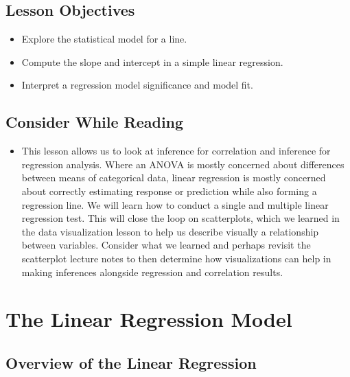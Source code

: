 \documentclass[
  letterpaper,
  DIV=11,
  numbers=noendperiod]{scrreprt}
\providecommand{\tightlist}{%
  \setlength{\itemsep}{0pt}\setlength{\parskip}{0pt}}\usepackage{longtable,booktabs,array}
\begin{document}
\section{Lesson Objectives}\label{lesson-objectives-9}

\begin{itemize}
\tightlist
\item
  Explore the statistical model for a line.
\item
  Compute the slope and intercept in a simple linear regression.
\item
  Interpret a regression model significance and model fit.
\end{itemize}

\section{Consider While Reading}\label{consider-while-reading-9}

\begin{itemize}
\tightlist
\item
  This lesson allows us to look at inference for correlation and
  inference for regression analysis. Where an ANOVA is mostly concerned
  about differences between means of categorical data, linear regression
  is mostly concerned about correctly estimating response or prediction
  while also forming a regression line. We will learn how to conduct a
  single and multiple linear regression test. This will close the loop
  on scatterplots, which we learned in the data visualization lesson to
  help us describe visually a relationship between variables. Consider
  what we learned and perhaps revisit the scatterplot lecture notes to
  then determine how visualizations can help in making inferences
  alongside regression and correlation results.
\end{itemize}


\chapter{The Linear Regression Model}\label{the-linear-regression-model}

\section{Overview of the Linear
Regression}\label{overview-of-the-linear-regression}
\end{document}
